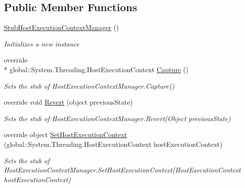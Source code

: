 \subsection*{Public Member Functions}
\begin{DoxyCompactItemize}
\item 
\hyperlink{class_system_1_1_threading_1_1_fakes_1_1_stub_host_execution_context_manager_a74a864a6502a6c978a4f0e3e69e85a8b}{Stub\-Host\-Execution\-Context\-Manager} ()
\begin{DoxyCompactList}\small\item\em Initializes a new instance\end{DoxyCompactList}\item 
override \\*
global\-::\-System.\-Threading.\-Host\-Execution\-Context \hyperlink{class_system_1_1_threading_1_1_fakes_1_1_stub_host_execution_context_manager_a500ddde73a6bd74ab66fbe2de0aa88f4}{Capture} ()
\begin{DoxyCompactList}\small\item\em Sets the stub of Host\-Execution\-Context\-Manager.\-Capture()\end{DoxyCompactList}\item 
override void \hyperlink{class_system_1_1_threading_1_1_fakes_1_1_stub_host_execution_context_manager_a1e345702117516c5183e6d1f20a79579}{Revert} (object previous\-State)
\begin{DoxyCompactList}\small\item\em Sets the stub of Host\-Execution\-Context\-Manager.\-Revert(\-Object previous\-State)\end{DoxyCompactList}\item 
override object \hyperlink{class_system_1_1_threading_1_1_fakes_1_1_stub_host_execution_context_manager_a6af5675934ce090d0414f0d93eb2d151}{Set\-Host\-Execution\-Context} (global\-::\-System.\-Threading.\-Host\-Execution\-Context host\-Execution\-Context)
\begin{DoxyCompactList}\small\item\em Sets the stub of Host\-Execution\-Context\-Manager.\-Set\-Host\-Execution\-Context(\-Host\-Execution\-Context host\-Execution\-Context)\end{DoxyCompactList}\end{DoxyCompactItemize}
